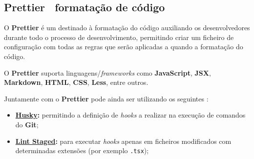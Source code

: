 \subsection{\textbf{Prettier} \textemdash~formatação de código}

\begin{minipage}{.3\textwidth}
\end{minipage}
\begin{minipage}{.7\textwidth}
	\minipagerestore
	O \textbf{Prettier} é um  destinado à formatação do código auxiliando os desenvolvedores durante todo o processo de desenvolvimento, permitindo criar um ficheiro de configuração com todas as regras que serão aplicadas a quando a formatação do código.

	O \textbf{Prettier} suporta linguagens/\textit{frameworks} como \textbf{JavaScript}, \textbf{JSX}, \textbf{Markdown}, \textbf{HTML}, \textbf{CSS}, \textbf{Less}, entre outros.

\end{minipage}

Juntamente com o \textbf{Prettier} pode ainda ser utilizando os seguintes :
\begin{itemize}
	\item \textbf{\href{https://github.com/typicode/husky}{Husky}:} permitindo a definição de \textit{hooks} a realizar na execução de comandos do \textbf{Git};
	\item \textbf{\href{https://github.com/okonet/lint-staged}{Lint Staged}:} para executar \textit{hooks} apenas em ficheiros modificados com determinadas extensões (por exemplo \verb|.tsx|);
\end{itemize}

